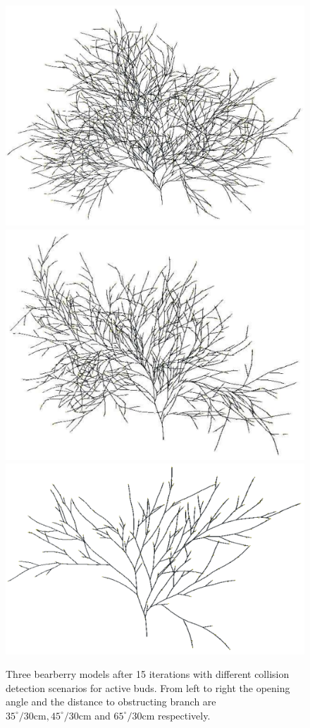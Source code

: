 \begin{figure}
\includegraphics[scale=0.15]{auvaursi-sandpit-15-35d-30cm}
\includegraphics[scale=0.15]{auvaursi-sandpit-15-45d-30cm}
\includegraphics[scale=0.15]{auvaursi-sandpit-15-65d-30cm}    
\caption{Three bearberry models after 15 iterations with different 
  collision detection  scenarios for active  buds. From left  to right
  the  opening  angle  and  the  distance to  obstructing  branch  are
  $35^{\circ}/30\mathrm{cm},       45^{\circ}/30\mathrm{cm}$       and
  $65^{\circ}/30\mathrm{cm}$ respectively.}\label{fig:a-uva-ursi}
\end{figure}

